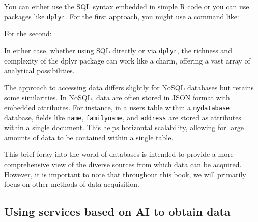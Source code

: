 You can either use the SQL syntax embedded in simple R code or you can
use packages like \texttt{dplyr}. For the first
approach, you might use a command like:

\begin{Shaded}
\begin{Highlighting}[]
\NormalTok{(}
\NormalTok{))}
\end{Highlighting}
\end{Shaded}

For the second:

\begin{Shaded}
\begin{Highlighting}[]
\OtherTok{\textless{}{-}} \NormalTok{)}
\SpecialCharTok{\%\textgreater{}\%}
  \NormalTok{(} \NormalTok{) }\SpecialCharTok{\%\textgreater{}\%}
\end{Highlighting}
\end{Shaded}

In either case, whether using SQL directly or via \texttt{dplyr},
the richness and complexity of the dplyr package can work like a charm,
offering a vast array of analytical possibilities.

The approach to accessing data differs slightly for NoSQL databases but
retains some similarities. In NoSQL, data are often stored in JSON
format with embedded attributes. For instance, in a users table within a
\texttt{mydatabase} database, fields like \texttt{name},
\texttt{familyname}, and \texttt{address} are stored as attributes
within a single document. This helps horizontal scalability,
allowing for large amounts of data to be contained within a single
table.

This brief foray into the world of databases is intended to provide a
more comprehensive view of the diverse sources from which data can be
acquired. However, it is important to note that throughout this book, we
will primarily focus on other methods of data acquisition.

\subsection{Using services based on AI to obtain
data}\label{use-services-based-on-ai-to-obtain-data}


